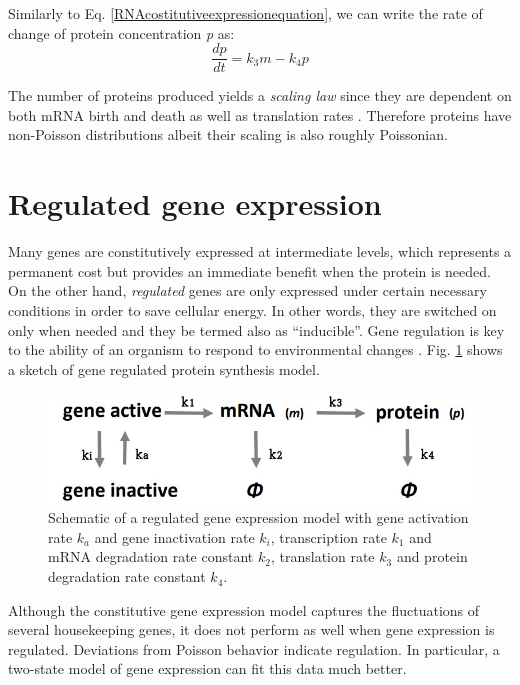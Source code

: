 \documentclass[12pt,a4paper]{report}
\begin{document}
Similarly to Eq. \ref{RNAcostitutiveexpressionequation}, we can write the rate of change of protein concentration \emph{p} as:
\begin{equation}\label{proteincostitutiveexpressionequation}
 \frac{dp}{dt} = k_{3}m - k_{4}p 
\end{equation}

The number of proteins produced yields a \emph{scaling law} since they are dependent on both mRNA birth and death as well as translation rates \cite{Article}. Therefore proteins have non-Poisson distributions albeit their scaling is also roughly Poissonian.

\section{Regulated gene expression}\label{regulatedgeneexpressionsection}
Many genes are constitutively expressed at intermediate levels, which represents a permanent cost but provides an immediate benefit when the protein is needed. On the other hand, \emph{regulated} genes are only expressed under certain necessary conditions in order to save cellular energy. In other words, they are switched on only when needed and they be termed also as ``inducible''. Gene regulation is key to the ability of an organism to respond to environmental changes \cite{generegulationNIH}. Fig. \ref{regulatedgeneexpression} shows a sketch of gene regulated protein synthesis model.

\begin{figure}[!ht]
\centering
\includegraphics[scale=0.40]{simplest_protein_synthesis_model.jpg}
\caption{Schematic of a regulated gene expression model with gene activation rate $k_{a}$ and gene inactivation rate $k_{i}$, transcription rate $k_{1}$ and mRNA degradation rate constant $k_{2}$, translation rate $k_{3}$ and protein degradation rate constant $k_{4}$.}
\label{regulatedgeneexpression}
\end{figure}

Although the constitutive gene expression model captures the fluctuations of several housekeeping genes, it does not perform as well when gene expression is regulated. Deviations from Poisson behavior indicate regulation. In particular, a two-state model of gene expression can fit this data much better.
\end{document}
